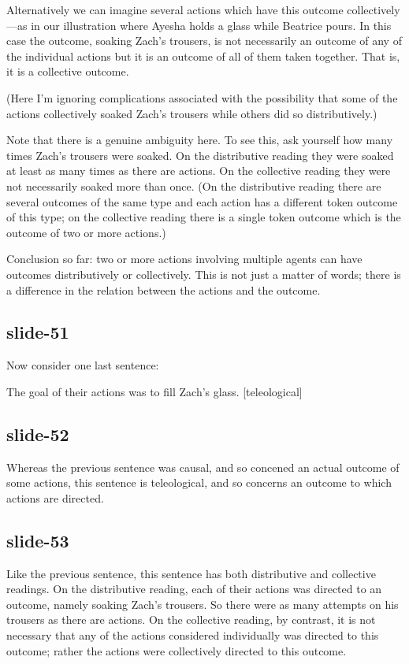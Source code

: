 \documentclass[12pt,\papersize]{extarticle}
\begin{document}
Alternatively we can imagine several actions which have this outcome collectively---as in
our illustration where Ayesha holds a glass while Beatrice pours.
In this case the outcome, soaking Zach’s trousers, is not necessarily an outcome of any of the
individual actions but it is an outcome of all of them taken together.
That is, it is a collective outcome.

(Here I'm ignoring complications associated with the possibility that some
of the actions collectively soaked Zach’s trousers while others did so distributively.)

Note that there is a genuine ambiguity here.
To see this, ask yourself how many times Zach’s trousers were soaked.
On the distributive reading they were soaked at least as many times as there are actions.
On the collective reading they were not necessarily soaked more than once.
(On the distributive reading there are several outcomes of the same type and each
action has a different token outcome of this type; on the collective reading there is a single token
outcome which is the outcome of two or more actions.)

Conclusion so far: two or more actions involving multiple agents can have outcomes
distributively or collectively.
This is not just a matter of words; there is a difference in the relation between
the actions and the outcome.

\subsection{slide-51}
Now consider one last sentence:

The goal of their actions was to fill Zach’s glass. [teleological]


\subsection{slide-52}
Whereas the previous sentence was causal, and so concened an actual outcome of some actions,
this sentence is teleological, and so concerns an outcome to which actions are directed.

\subsection{slide-53}
Like the previous sentence, this sentence has both distributive and collective readings.
On the distributive reading, each of their actions was directed to an outcome,
namely soaking Zach’s trousers.  So there were as many attempts on his trousers as there
are actions.
On the collective reading, by contrast, it is not necessary that any of the actions
considered individually was directed to this outcome;
rather the actions were collectively directed to this outcome.
\end{document}
